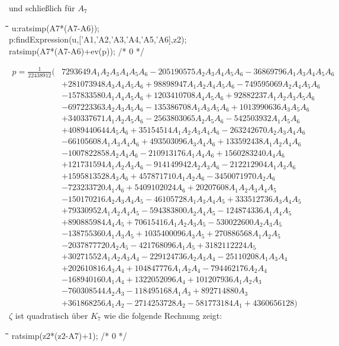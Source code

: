 \documentclass[11pt]{article}
\newenvironment{code}{\tt \begin{tabbing}
\hskip12pt\=\hskip12pt\=\hskip12pt\=\hskip12pt\=\hskip5cm\=\hskip5cm\=\kill}
{\end{tabbing}}
\begin{document}
und schließlich für $A_7$
\begin{code}
u:ratsimp(A7*(A7-A6));\\
p:findExpression(u,['A1,'A2,'A3,'A4,'A5,'A6],z2);\\
ratsimp(A7*(A7-A6)+ev(p)); /* 0 */
\end{code}
\begin{align*}
  p=\frac{1}{22438912}\Big(& 7293649A_{1}A_{2}A_{3}A_{4}A_{5}A_{6}
  -205190575A_{2}A_{3}A_{4}A_{5}A_{6} -36869796A_{1}A_{3}A_{4}A_{5}A_{6}
  \\&+281073948A_{3}A_{4}A_{5}A_{6} +98898947A_{1}A_{2}A_{4}A_{5}A_{6}
  -749595069A_{2}A_{4}A_{5}A_{6}\\&-157833580A_{1}A_{4}A_{5}A_{6}
  +1203410708A_{4}A_{5}A_{6}+92882237A_{1}A_{2}A_{3}A_{5}A_{6}
  \\&-697223363A_{2}A_{3}A_{5}A_{6}-135386708A_{1}A_{3}A_{5}A_{6}
  +1013990636A_{3}A_{5}A_{6}\\&+340337671A_{1}A_{2}A_{5}A_{6}
  -2563803065A_{2}A_{5}A_{6}-542503932A_{1}A_{5}A_{6} \\&+4089440644A_{5}A_{6}
  +35154514A_{1}A_{2}A_{3}A_{4}A_{6} -263242670A_{2}A_{3}A_{4}A_{6}
  \\&-66105608A_{1}A_{3}A_{4}A_{6} +493503096A_{3}A_{4}A_{6}
  +133592438A_{1}A_{2}A_{4}A_{6} \\&-1007822858A_{2}A_{4}A_{6}
  -210913176A_{1}A_{4}A_{6} +1560283240A_{4}A_{6}
  \\&+121731594A_{1}A_{2}A_{3}A_{6} -914149942A_{2}A_{3}A_{6}
  -212212904A_{1}A_{3}A_{6} \\&+1595813528A_{3}A_{6} +457871710A_{1}A_{2}A_{6}
  -3450071970A_{2}A_{6}\\&-723233720A_{1}A_{6}+5409102024A_{6}
  +20207608A_{1}A_{2}A_{3}A_{4}A_{5}\\&-150170216A_{2}A_{3}A_{4}A_{5}
  -46105728A_{1}A_{3}A_{4}A_{5}+333512736A_{3}A_{4}A_{5}
  \\&+79330952A_{1}A_{2}A_{4}A_{5}-594383800A_{2}A_{4}A_{5}
  -124874336A_{1}A_{4}A_{5}\\&+890885984A_{4}A_{5} +70615416A_{1}A_{2}A_{3}A_{5}
  -530022600A_{2}A_{3}A_{5}\\&-138755360A_{1}A_{3}A_{5}+1035400096A_{3}A_{5}
  +270886568A_{1}A_{2}A_{5}\\&-2037877720A_{2}A_{5}-421768096A_{1}A_{5}
  +3182112224A_{5}\\&+30271552A_{1}A_{2}A_{3}A_{4} -229124736A_{2}A_{3}A_{4}
  -25110208A_{1}A_{3}A_{4}\\&+202610816A_{3}A_{4}+104847776A_{1}A_{2}A_{4}
  -794462176A_{2}A_{4}\\&-168940160A_{1}A_{4}+1322052096A_{4}
  +101207936A_{1}A_{2}A_{3} \\&-760308544A_{2}A_{3}-118495168A_{1}A_{3}
  +892714880A_{3}\\&+361868256A_{1}A_{2}-2714253728A_{2}-581773184A_{1}
  +4360656128\Big)
\end{align*}
$\zeta$ ist quadratisch über $K_7$ wie die folgende Rechnung zeigt:
\begin{code}
ratsimp(z2*(z2-A7)+1); /* 0 */
\end{code}
\end{document}

